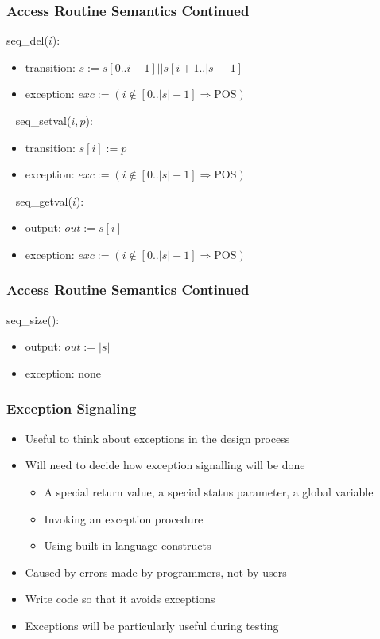 \documentclass[t, 12pt, numbers, fleqn, handout]{beamer}
\begin{document}
\begin{frame}
\frametitle{Access Routine Semantics Continued}

\noindent seq\_del($i$):
\begin{itemize}
\item transition: $s := s[0..i-1] || s[i+1..|s|-1]$
\item exception:  $exc := (i \notin [0..|s|-1] \Rightarrow \mathrm{POS})$
\end{itemize}
~\newline
\noindent seq\_setval($i, p$):
\begin{itemize}
\item transition: $s[i] := p$
\item exception: $exc := (i \notin [0..|s|-1] \Rightarrow \mathrm{POS})$
\end{itemize}
~\newline
\noindent seq\_getval($i$):
\begin{itemize}
\item output: $out := s[i]$
\item exception: $exc := (i \notin [0..|s|-1] \Rightarrow \mathrm{POS})$
\end{itemize}

\end{frame}


\begin{frame}
\frametitle{Access Routine Semantics Continued}

\noindent seq\_size():
\begin{itemize}
\item output: $out := | s |$
\item exception: none
\end{itemize}

\end{frame}


\begin{frame}

\frametitle{Exception Signaling}

\begin{itemize}
\item Useful to think about exceptions in the design process
\item Will need to decide how exception signalling will be done
\begin{itemize}
\item A special return value, a special status parameter, a global variable
\item Invoking an exception procedure
\item Using built-in language constructs
\end{itemize}
\item Caused by errors made by programmers, not by users
\item Write code so that it avoids exceptions
\item Exceptions will be particularly useful during testing
\end{itemize}

\end{frame}
\end{document}
